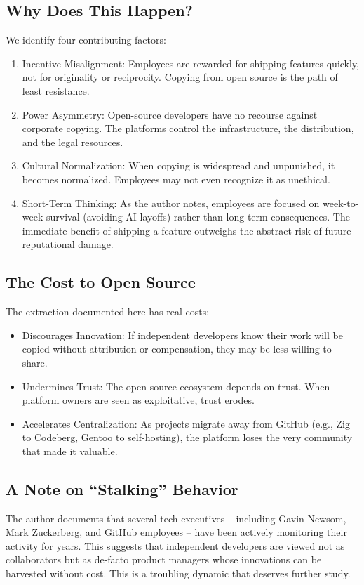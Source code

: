 \documentclass[12pt]{article}
\begin{document}
\subsection{Why Does This Happen?}
We identify four contributing factors:
\begin{enumerate}
\item Incentive Misalignment: Employees are rewarded for shipping features quickly, not for originality or reciprocity. Copying from open source is the path of least resistance.
\item Power Asymmetry: Open-source developers have no recourse against corporate copying. The platforms control the infrastructure, the distribution, and the legal resources.
\item Cultural Normalization: When copying is widespread and unpunished, it becomes normalized. Employees may not even recognize it as unethical.
\item Short-Term Thinking: As the author notes, employees are focused on week-to-week survival (avoiding AI layoffs) rather than long-term consequences. The immediate benefit of shipping a feature outweighs the abstract risk of future reputational damage.
\end{enumerate}

\subsection{The Cost to Open Source}
The extraction documented here has real costs:
\begin{itemize}
\item Discourages Innovation: If independent developers know their work will be copied without attribution or compensation, they may be less willing to share.
\item Undermines Trust: The open-source ecosystem depends on trust. When platform owners are seen as exploitative, trust erodes.
\item Accelerates Centralization: As projects migrate away from GitHub (e.g., Zig to Codeberg\cite{zig2026}, Gentoo to self-hosting\cite{gentoo2026}), the platform loses the very community that made it valuable.
\end{itemize}

\subsection{A Note on ``Stalking'' Behavior}
The author documents that several tech executives -- including Gavin Newsom, Mark Zuckerberg, and GitHub employees -- have been actively monitoring their activity for years. This suggests that independent developers are viewed not as collaborators but as de-facto product managers whose innovations can be harvested without cost. This is a troubling dynamic that deserves further study.
\end{document}
